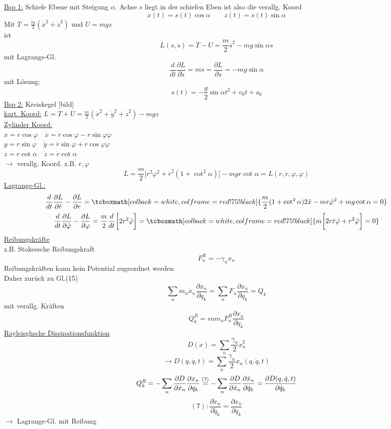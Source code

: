 \documentclass[titlepage,12pt,a4paper,ngerman]{report}
\newcommand{\rmbox}[1]{\tcboxmath[colback=white,colframe=red!75!black]{#1}} %
\renewcommand{\boxed}{\rmbox}
\begin{document}
{\underline{Bsp 1:} Schiefe Ebene mit Steigung $ \alpha $. Achse $ s $ liegt in der schiefen Eben ist also die verallg. Koord
$$ x(t) = s(t) \cos \alpha \qquad z(t) = s(t) \sin \alpha$$
Mit $ T = \frac{m}{2} (\dot{x}^2 + \dot{z}^2) $ und $ U = mgz $\\
ist $$ L(s,\dot{s}) = T-U = \frac{m}{2} \dot{s}^2 - mg \sin \alpha s $$
mit Lagrange-Gl. 
$$\frac{d}{dt} \frac{\partial L}{\partial \dot{s}} = m \ddot{s} = \frac{\partial L}{\partial s} = - mg \sin \alpha$$
mit Lösung:
$$ s(t) = -\frac{g}{2} \sin \alpha t^2 + v_0 t + s_0 $$
\underline{Bsp 2:} Kreiskegel [bild]\\
\underline{kart. Koord:} $ L = T+U = \frac{m}{2} (\dot{x}^2 + \dot{y}^2 + \dot{z}^2) - mgz $\\
\underline{Zylinder Koord:}\\
$ x = r \cos \varphi \quad \dot{x} = \dot{r} \cos \varphi - r \sin \varphi \dot{\varphi} $ \\
$ y = r \sin \varphi \quad \dot{y} = \dot{r} \sin \varphi + r \cos \varphi \dot{\varphi} $\\
$z = r \cot \alpha \quad \dot{z} = \dot{r} \cot \alpha $\\
$ \rightarrow $ verallg. Koord. z.B. $ r,\varphi $\\
$$L = \frac{m}{2} \bigg[r^2 \varphi^2 + \dot{r}^2 ( 1 + \cot ^2 \alpha)\bigg] - mg r \cot \alpha = L(r,\dot{r}, \varphi , \dot{\varphi})$$
\underline{Lagrange-Gl.:}
$$\frac{d}{dt} \frac{\partial L}{\partial \dot{r}} - \frac{\partial L}{\partial r} = \boxed{\frac{m}{2} (1 + \cot^2 \alpha) 2 \ddot{x} - m r \dot{\varphi}^2 + m g \cot \alpha = 0}$$
$$ \frac{d}{dt} \frac{\partial L}{\partial \dot{\varphi}} - \frac{\partial L}{\partial \varphi} = \frac{m}{2} \frac{d}{dt} \bigg[2 r^2 \dot{\varphi}\bigg] = \boxed{m \bigg[2 r \dot{r} \dot{\varphi} + r^2 \ddot{\varphi}\bigg] = 0}$$
\underline{Reibungskräfte}\\
z.B. Stokessche Reibungskraft
$$F_n^R = - \gamma _n \dot{x}_n$$
Reibungskräften kann kein Potential zugeordnet werden\\
Daher zurück zu Gl.(15)
$$ \sum_n m_n \ddot{x}_n \frac{\partial x_n}{\partial q_k} = \sum_n F_n \frac{\partial x_n}{\partial q_k} = Q_k$$
mit verallg. Kräften 
$$ Q_k^R = sum_n F_n^R \frac{\partial x_n}{\partial q_k} $$
\underline{Rayleisghsche Dissipationsfunktion}
$$D(\dot{x}) = \sum_n \frac{\gamma _n}{2} \dot{x}^2_n$$
$$\rightarrow D(q, \dot{q}, t) = \sum_n \frac{\gamma_n}{2} x_n(q,\dot{q},t) $$
$$Q_k^R = - \sum_n \frac{\partial D}{\partial \dot{x}_n} \frac{\partial x_n}{\partial q_k} \buildrel (7) \over =  - \sum_n \frac{\partial D}{\partial \dot{x}_n} \frac{\partial \dot{x}_n}{\partial \dot{q}_k} = \frac{\partial D(q,\dot{q},t)}{\partial \dot{q}_k}$$
$$ (7) : \frac{\partial \dot{x}_n}{\partial \dot{q}_k} = \frac{\partial x_n}{\partial q_k}$$
$ \rightarrow  $ Lagrange-Gl. mit Reibung

}
\end{document}

